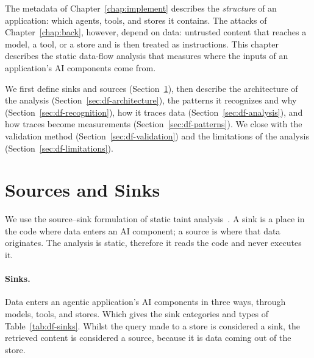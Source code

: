 \providecommand{\pv}[1]{\textcolor{blue}{#1}} %
\label{sec:toolkit}

The metadata of Chapter~\ref{chap:implement} describes the \emph{structure} of an application: which agents, tools, and stores it contains. The attacks of Chapter~\ref{chap:back}, however, depend on data: untrusted content that reaches a model, a tool, or a store and is then treated as instructions. This chapter describes the static data-flow analysis that measures where the inputs of an application's AI components come from. 

We first define sinks and sources (Section~\ref{sec:df-model}), then describe the architecture of the analysis (Section~\ref{sec:df-architecture}), the patterns it recognizes and why (Section~\ref{sec:df-recognition}), how it traces data (Section~\ref{sec:df-analysis}), and how traces become measurements (Section~\ref{sec:df-patterns}). We close with the validation method (Section~\ref{sec:df-validation}) and the limitations of the analysis (Section~\ref{sec:df-limitations}).

\section{Sources and Sinks}
\label{sec:df-model}

We use the source--sink formulation of static taint analysis~\cite{livshits2005,arzt2014flowdroid}. A sink is a place in the code where data enters an AI component; a source is where that data originates. The analysis is static, therefore it reads the code and never executes it.

\paragraph{Sinks.} Data enters an agentic application's AI components in three ways, through models, tools, and stores. Which gives the sink categories and types of Table~\ref{tab:df-sinks}.
Whilst the query made to a store is considered a sink, the retrieved content is considered a source, because it is data coming out of the store.

